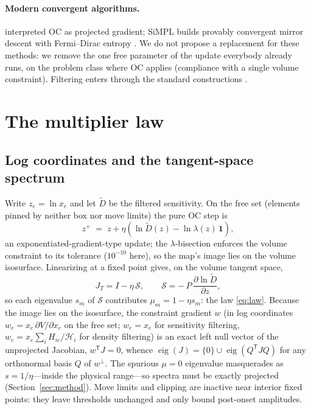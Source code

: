\documentclass[11pt,a4paper]{article}
\newcommand{\Dfilt}{\tilde{D}}
\begin{document}
\paragraph{Modern convergent algorithms.} \citet{ananiev2005}
interpreted OC as projected gradient; SiMPL builds provably convergent
mirror descent with Fermi--Dirac entropy
\citep{kim2025simpl,keith2025simpl}. We do not propose a replacement for
these methods: we remove the one free parameter of the update everybody
already runs, on the problem class where OC applies (compliance with a
single volume constraint). Filtering enters through the standard
constructions \citep{sigmund1998numerical,bourdin2001}.

\section{The multiplier law}\label{sec:theory}

\subsection{Log coordinates and the tangent-space spectrum}

Write $z_e=\ln x_e$ and let $\Dfilt$ be the filtered sensitivity. On the
free set (elements pinned by neither box nor move limits) the pure OC
step is
\begin{equation}
  z^{+} \;=\; z + \eta\left(\ln \Dfilt(z) - \ln\lambda(z)\,\mathbf 1\right),
  \label{eq:logstep}
\end{equation}
an exponentiated-gradient-type update; the $\lambda$-bisection enforces
the volume constraint to its tolerance ($10^{-10}$ here), so the map's
image lies on the volume isosurface. Linearizing at a fixed point gives,
on the volume tangent space,
\begin{equation}
  J_T = I-\eta\,\mathcal S,\qquad \mathcal S = -\,P\,
  \frac{\partial \ln\Dfilt}{\partial z},
  \label{eq:JT}
\end{equation}
so each eigenvalue $s_m$ of $\mathcal S$ contributes $\mu_m=1-\eta s_m$:
the law \eqref{eq:law}. Because the image lies on the isosurface, the
constraint gradient $w$ (in log coordinates $w_e=x_e\,\partial
V/\partial x_e$ on the free set; $w_e=x_e$ for sensitivity filtering,
$w_e=x_e\sum_i H_{ie}/\mathcal H_i$ for density filtering) is an exact
left null vector of the unprojected Jacobian, $w^{\mathsf T}J=0$, whence
$\operatorname{eig}(J)=\{0\}\cup\operatorname{eig}(Q^{\mathsf T}JQ)$ for
any orthonormal basis $Q$ of $w^{\perp}$. The spurious $\mu=0$
eigenvalue masquerades as $s=1/\eta$---inside the physical range---so
spectra must be exactly projected (Section~\ref{sec:method}). Move
limits and clipping are inactive near interior fixed points: they leave
thresholds unchanged and only bound post-onset amplitudes.
\end{document}
